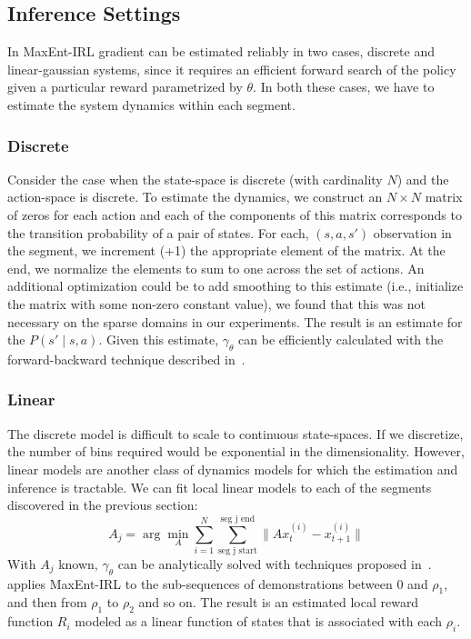 \subsection{Inference Settings}
In MaxEnt-IRL gradient can be estimated reliably in two cases, discrete and linear-gaussian systems, since it requires an efficient forward search of the policy given a particular reward parametrized by $\theta$.
In both these cases, we have to estimate the system dynamics within each segment.

\subsubsection{Discrete}
Consider the case when the state-space is discrete (with cardinality $N$) and the action-space is discrete. 
To estimate the dynamics, we construct an $N \times N$ matrix of zeros for each action and each of the components 
of this matrix corresponds to the transition probability of a pair of states.
For each, $(s,a,s')$ observation in the segment, we increment (+1) the appropriate element of the matrix.
At the end, we normalize the elements to sum to one across the set of actions.
An additional optimization could be to add smoothing to this estimate (i.e., initialize the matrix with some non-zero constant value), we found that this was not necessary on the sparse domains in our experiments.
The result is an estimate for the $P(s' \mid s, a)$.
Given this estimate, $\gamma_{\theta}$ can be efficiently calculated with the forward-backward technique described in~\cite{DBLP:conf/aaai/ZiebartMBD08}.

\subsubsection{Linear}
The discrete model is difficult to scale to continuous state-spaces.
If we discretize, the number of bins required would be exponential in the dimensionality.
However, linear models are another class of dynamics models for which the estimation and inference is tractable.
We can fit local linear models to each of the segments discovered in the previous section:
\[
A_j = \arg\min_{A} \sum_{i=1}^N \sum_{\text{seg j start}}^{\text{seg j end}} \|A x^{(i)}_{t} - x^{(i)}_{t+1}\|
\]
With $A_j$ known, $\gamma_{\theta}$ can be analytically solved with techniques proposed in~\cite{ziebart2012probabilistic}.
\hirl applies MaxEnt-IRL to the sub-sequences of demonstrations between 0 and $\rho_1$, and then from $\rho_1$ to $\rho_2$ and so on.
The result is an estimated local reward function $R_{i}$ modeled as a linear function of states that is associated with each $\rho_i$.

